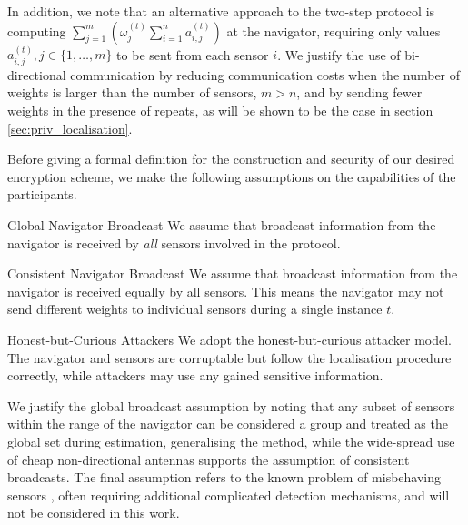 \documentclass[10pt,letterpaper,oneside,twocolumn,journal]{IEEEtran}
\theoremstyle{definition}
\theoremstyle{definition}
\theoremstyle{remark}
\begin{document}
In addition, we note that an alternative approach to the two-step protocol is computing $\sum^{m}_{j=1}(\omega_j^{(t)}\sum^{n}_{i=1} a_{i,j}^{(t)})$ at the navigator, requiring only values $a_{i,j}^{(t)}, j\in\{1,\dots,m\}$ to be sent from each sensor $i$. We justify the use of bi-directional communication by reducing communication costs when the number of weights is larger than the number of sensors, $m>n$, and by sending fewer weights in the presence of repeats, as will be shown to be the case in section \ref{sec:priv_localisation}.

Before giving a formal definition for the construction and security of our desired encryption scheme, we make the following assumptions on the capabilities of the participants.
\begin{LaTeXdescription}
    \item[Global Navigator Broadcast] We assume that broadcast information from the navigator is received by \textit{all} sensors involved in the protocol.
    \item[Consistent Navigator Broadcast] We assume that broadcast information from the navigator is received equally by all sensors. This means the navigator may not send different weights to individual sensors during a single instance $t$.
    \item[Honest-but-Curious Attackers] We adopt the honest-but-curious attacker model. The navigator and sensors are corruptable but follow the localisation procedure correctly, while attackers may use any gained sensitive information.
\end{LaTeXdescription}
We justify the global broadcast assumption by noting that any subset of sensors within the range of the navigator can be considered a group and treated as the global set during estimation, generalising the method, while the wide-spread use of cheap non-directional antennas supports the assumption of consistent broadcasts. The final assumption refers to the known problem of misbehaving sensors \cite{lazosSeRLocSecureRangeindependent2004,ben-galOutlierDetection2005}, often requiring additional complicated detection mechanisms, and will not be considered in this work.
\end{document}
